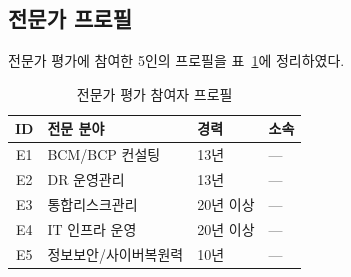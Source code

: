 \subsection{전문가 프로필}
\label{app:expert-profiles}

전문가 평가에 참여한 5인의 프로필을 \p{[}표~\ref{tab:app-expert-profile}\p{]}에 정리하였다.

\begin{table}[htbp]
\centering
\caption{전문가 평가 참여자 프로필}
\label{tab:app-expert-profile}
\small
\begin{tabular}{clll}
\toprule
\textbf{ID} & \textbf{전문 분야} & \textbf{경력} & {\textbf{소속}} \\
\midrule
E1 & {BCM/BCP 컨설팅}      & {13년}       & {---} \\
E2 & {DR 운영관리}          & {13년}       & {---} \\
E3 & {통합리스크관리}        & {20년 이상}  & {---} \\
E4 & {IT 인프라 운영}        & {20년 이상}  & {---} \\
E5 & {정보보안/사이버복원력}  & {10년}       & {---} \\
\bottomrule
\end{tabular}
\end{table}



